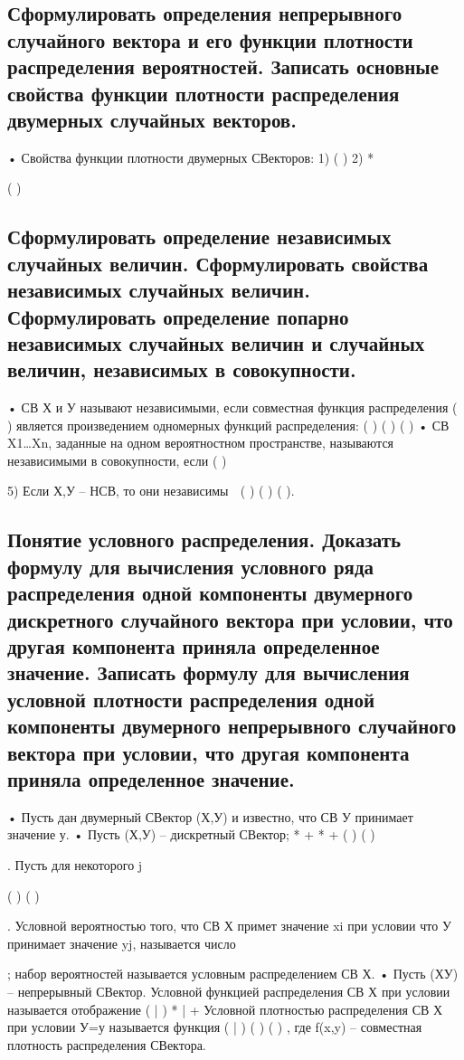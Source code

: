 \subsection{Сформулировать определения непрерывного случайного вектора и его функции плотности распределения вероятностей. Записать основные свойства функции плотности распределения двумерных случайных векторов.}

• Свойства функции плотности двумерных СВекторов:
1) ( )
2) *

( ) 

\subsection{Сформулировать определение независимых случайных величин. Сформулировать свойства независимых случайных величин. Сформулировать определение попарно независимых случайных величин и случайных величин, независимых в совокупности.}

• СВ Х и У называют независимыми, если совместная функция распределения ( ) является произведением одномерных функций
распределения: ( )
( )
( )
• СВ X1…Xn, заданные на одном вероятностном пространстве, называются независимыми в совокупности, если
(
)


5) Если Х,У – НСВ, то они независимы  ( )
( )
( ).

\subsection{Понятие условного распределения. Доказать формулу для вычисления условного ряда распределения одной компоненты двумерного дискретного случайного вектора при условии, что другая компонента приняла определенное значение. Записать формулу для вычисления условной плотности распределения одной компоненты двумерного непрерывного случайного вектора при условии, что другая компонента приняла определенное значение.}

• Пусть дан двумерный СВектор (Х,У) и известно, что СВ У принимает значение у.
• Пусть (Х,У) – дискретный СВектор; *
+ *
+ {( ) (
	)} {
	
}. Пусть для некоторого j

{
	
}
{( ) (
	)}
{
}



. Условной вероятностью того, что СВ Х примет значение xi при условии что У принимает
значение yj, называется число


; набор вероятностей называется условным распределением СВ Х.
• Пусть (ХУ) – непрерывный СВектор. Условной функцией распределения СВ Х при условии называется отображение
( | )
* | + Условной плотностью распределения СВ Х при условии У=у называется функция
( | )
( )
( )
, где f(x,y) – совместная
плотность распределения СВектора.

